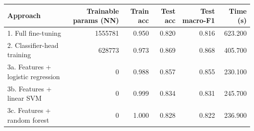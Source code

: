 \begin{tabular}{lrrrrr}
\toprule
Approach & Trainable params (NN) & Train acc & Test acc & Test macro-F1 & Time (s) \\
\midrule
1. Full fine-tuning & 1555781 & 0.950 & 0.820 & 0.816 & 623.200 \\
2. Classifier-head training & 628773 & 0.973 & 0.869 & 0.868 & 405.700 \\
3a. Features + logistic regression & 0 & 0.988 & 0.857 & 0.855 & 230.100 \\
3b. Features + linear SVM & 0 & 0.999 & 0.834 & 0.831 & 245.700 \\
3c. Features + random forest & 0 & 1.000 & 0.828 & 0.822 & 236.900 \\
\bottomrule
\end{tabular}
